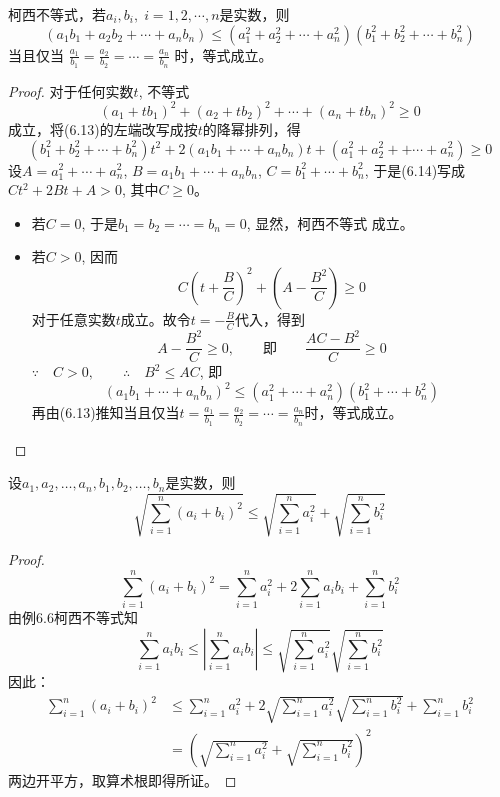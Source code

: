 \begin{example}
    柯西不等式，若$a_i,b_i,\; i=1,2,\cdots ,n$是实数，则
\[(a_1b_1+a_2b_2+\cdots +a_nb_n)\le (a_1^2+a_2^2+\cdots +a_n^2)(b_1^2+b_2^2+\cdots+b_n^2)\]
当且仅当
$\frac{a_1}{b_1}=\frac{a_2}{b_2}=\cdots=\frac{a_n}{b_n}$
时，等式成立。
\end{example}

\begin{proof}
对于任何实数$t$, 不等式
\begin{equation}
    (a_1+tb_1)^2+(a_2+tb_2)^2+\cdots +(a_n+tb_n)^2\ge 0
\end{equation}
成立，将(6.13)的左端改写成按$t$的降幂排列，得
\begin{equation}
   ( b^2_1+b^2_2+\cdots +b^2_n)t^2+2(a_1b_1+\cdots +a_nb_n)t+(a^2_1+a_2^2+
+\cdots +a_n^2)\ge 0
\end{equation} 
设$A=a^2_1+\cdots +a_n^2$, $B=a_1b_1+\cdots +a_nb_n$,
$C=b^2_1+\cdots +b^2_n$, 
于是(6.14)写成
$Ct^2+2Bt+A>0$, 其中$C\ge 0$。
\begin{itemize}
    \item 若$C=0$, 于是$b_1=b_2=\cdots =b_n=0$, 显然，柯西不等式
成立。
\item 若$C>0$, 因而$$C\left(t+\frac{B}{C}\right)^2+\left(A-\frac{B^2}{C}\right)\ge 0$$
对于任意实数$t$成立。故令$t=-\frac{B}{C}$代入，得到
\[A-\frac{B^2}{C}\ge 0,\qquad \text{即}\qquad \frac{AC-B^2}{C}\ge 0\]
$\because\quad C>0,\qquad \therefore\quad B^2\le AC$, 即
\[(a_1b_1+\cdots +a_nb_n)^2\le (a^2_1+\cdots +a^2_n)(b^2_1+\cdots +b^2_n)\]
再由(6.13)推知当且仅当$t=\frac{a_1}{b_1}=\frac{a_2}{b_2}=\cdots=\frac{a_n}{b_n}$时，等式成立。
\end{itemize}
\end{proof}

\begin{example}
    设$a_1,a_2,\ldots,a_n,b_1,b_2,\ldots,b_n$是实数，则
\[\sqrt{\sum^n_{i=1}(a_i+b_i)^2}\le \sqrt{\sum^n_{i=1}a^2_i}+\sqrt{\sum^n_{i=1}b^2_i}\]
\end{example}

\begin{proof}
 \[   \sum^n_{i=1}(a_i+b_i)^2=\sum^n_{i=1}a_i^2+2\sum^n_{i=1}a_ib_i+\sum^n_{i=1}b_i^2\]
由例6.6柯西不等式知
\[\sum^n_{i=1}a_ib_i\le\left|\sum^n_{i=1}a_ib_i\right|\le \sqrt{\sum^n_{i=1}a_i^2}\sqrt{\sum^n_{i=1}b_i^2}\]
因此：
\[\begin{split}
    \sum^n_{i=1}(a_i+b_i)^2&\le \sum^n_{i=1}a_i^2+2\sqrt{\sum^n_{i=1}a_i^2}\sqrt{\sum^n_{i=1}b_i^2}+\sum^n_{i=1}b_i^2\\
    &=\left(\sqrt{\sum^n_{i=1}a^2_i}+\sqrt{\sum^n_{i=1}b^2_i}\right)^2
\end{split}\]
两边开平方，取算术根即得所证。
\end{proof}    

